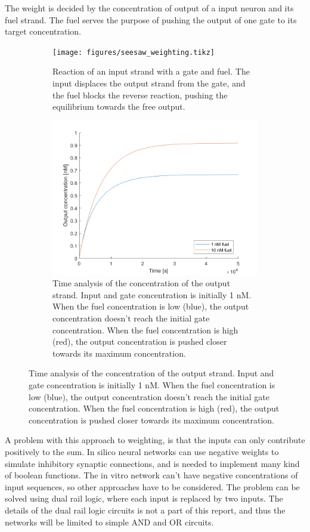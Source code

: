 The weight is decided by the concentration of output of a input neuron and its fuel strand. The fuel serves the purpose of pushing the output of one gate to its target concentration.

\begin{figure}[H]
  \begin{subfigure}[t]{.49\textwidth}
    \texttt{[image: figures/seesaw\_weighting.tikz]}
\caption{Reaction of an input strand with a gate and fuel. The input displaces the output strand from the gate, and the fuel blocks the reverse reaction, pushing the equilibrium towards the free output.}
\label{}
\end{subfigure}
\quad
\begin{subfigure}[t]{.49\columnwidth}
  \centering
\includegraphics[width=\linewidth]{images/weighting.png}
\caption{Time analysis of the concentration of the output strand. Input and gate concentration is initially 1 nM. When the fuel concentration is low (blue), the output concentration doesn't reach the initial gate concentration. When the fuel concentration is high (red), the output concentration is pushed closer towards its maximum concentration.}
\label{}
\end{subfigure}
\label{seesaw_weighting}
\end{figure}

A problem with this approach to weighting, is that the inputs can only contribute positively to the sum. In silico neural networks can use negative weights to simulate inhibitory synaptic connections, and is needed to implement many kind of boolean functions. The in vitro network can't have negative concentrations of input sequences, so other approaches have to be considered. The problem can be solved using dual rail logic, where each input is replaced by two inputs. The details of the dual rail logic circuits is not a part of this report, and thus the networks will be limited to simple AND and OR circuits.


